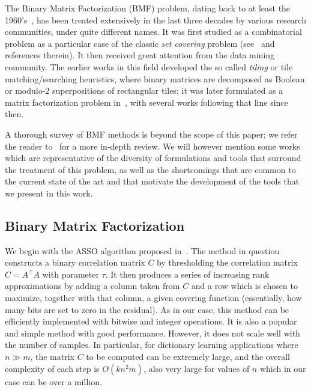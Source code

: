 \documentclass[twocolumn]{IEEEtran}
\theoremstyle{definition}
\def\transp{^\intercal}
\begin{document}
%
The Binary Matrix Factorization (BMF) problem, dating back to at least the 1960's~\cite{bmf-oldest}, has been treated extensively in the last three decades by various research communities, under quite different names. It was first studied as a combinatorial problem as a particular case of the classic \emph{set covering} problem (see~\cite{monson95} and references therein). It then received great attention from the data mining community. The earlier works in this field developed the so called \emph{tiling} or {tile matching/searching} heuristics, where binary matrices are decomposed as Boolean or modulo-2 superpositions of rectangular tiles\cite{proximus,tiling}; it was later formulated as a matrix factorization problem in~\cite{asso}, with several works following that line since then.

A thorough survey of BMF methods is beyond the scope of this paper; we refer the reader to~\cite{bmf-comp} for a more in-depth review. We will however mention some works which are representative of the diversity of formulations and tools that surround the treatment of this problem, as well as the shortcomings that are common to the current state of the art and that motivate the development of the tools that we present in this work.

\subsection{Binary Matrix Factorization}

We begin with the ASSO algorithm proposed in~\cite{asso}. The method in question constructs a binary correlation matrix $C$ by thresholding the correlation matrix $C=A{\transp}A$ with parameter $\tau$. It then produces a series of increasing rank approximations by adding a column taken from $C$ and a row which is chosen to maximize, together with that column, a given covering function (essentially, how many bits are set to zero in the residual). As in our case, this method can be efficiently implemented with bitwise and integer operations. It is also a popular and simple method with good performance. However, it does not scale well with the number of samples. In particular, for dictionary learning applications where $n \gg m$, the matrix $C$ to be computed can be extremely large, and the overall complexity of each step is $O(kn^2m)$, also very large for values of $n$ which in our case can be over a million.
\end{document}
